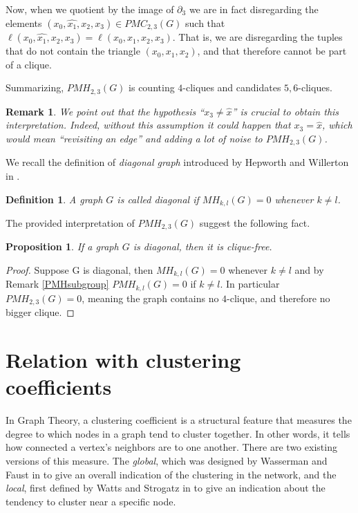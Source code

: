 \documentclass{article}
\newtheorem{proposition}[theorem]{Proposition}
\newtheorem{definition}[theorem]{Definition}
\newtheorem{remark}[theorem]{Remark}
\begin{document}
	Now, when we quotient by the image of $\partial_3$ we are in fact disregarding the elements $(x_0,\hat{x_1},x_2,x_3) \in PMC_{2,3}(G)$ such that $\ell(x_0,\hat{x_1},x_2,x_3)=\ell(x_0,x_1,x_2,x_3)$. That is, we are disregarding the tuples that do not contain the triangle $(x_0,x_1,x_2)$, and that therefore cannot be part of a clique.
	
	Summarizing, $PMH_{2,3}(G)$ is counting $4$-cliques and candidates $5,6$-cliques.
	
	\begin{remark}
		We point out that the hypothesis ``$x_3 \neq \hat{x}$'' is crucial to obtain this interpretation. 
		Indeed, without this assumption it could happen that $x_3 = \hat{x}$, which would mean ``revisiting an edge'' and adding a lot of noise to $PMH_{2,3}(G)$.
	\end{remark}
	
	We recall the definition of \emph{diagonal graph} introduced by Hepworth and Willerton in \cite{hepworth2015categorifying}.
	
	\begin{definition}
		A graph $G$ is called diagonal if $MH_{k,l}(G) = 0$ whenever $k \neq l$.
	\end{definition}
	
	The provided interpretation of $PMH_{2,3}(G)$ suggest the following fact.
	
	\begin{proposition}
		If a graph $G$ is diagonal, then it is clique-free.
	\end{proposition}
	
	\begin{proof}
		Suppose G is diagonal, then $MH_{k,l}(G) = 0$ whenever $k \neq l$ and by Remark \ref{PMHsubgroup} $PMH_{k,l}(G)=0$ if $k \neq l$. 
		In particular $PMH_{2,3}(G)=0$, meaning the graph contains no $4$-clique, and therefore no bigger clique.
	\end{proof}
	
	\section{Relation with clustering coefficients}
	
	In Graph Theory, a clustering coefficient is a structural feature that measures the degree to which nodes in a graph tend to cluster together.
	In other words, it tells how connected a vertex’s neighbors are to one another.
	There are two existing versions of this measure.
	The \emph{global}, which was designed by Wasserman and Faust in \cite{wasserman1994social} to give an overall indication of the clustering in the network, and the \emph{local}, first defined by Watts and Strogatz in \cite{watts1998collective} to give an indication about the tendency to cluster near a specific node.
	
\end{document}
